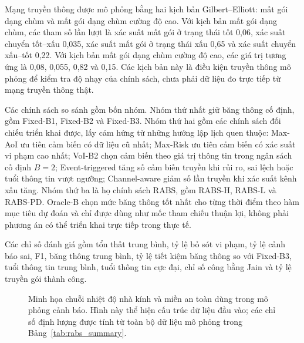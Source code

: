 \documentclass[10pt]{article}
\begin{document}
Mạng truyền thông được mô phỏng bằng hai kịch bản Gilbert--Elliott: mất gói dạng chùm và mất gói dạng chùm cường độ cao. Với kịch bản mất gói dạng chùm, các tham số lần lượt là xác suất mất gói ở trạng thái tốt 0,06, xác suất chuyển tốt--xấu 0,035, xác suất mất gói ở trạng thái xấu 0,65 và xác suất chuyển xấu--tốt 0,22. Với kịch bản mất gói dạng chùm cường độ cao, các giá trị tương ứng là 0,08, 0,055, 0,82 và 0,15. Các kịch bản này là điều kiện truyền thông mô phỏng để kiểm tra độ nhạy của chính sách, chưa phải dữ liệu đo trực tiếp từ mạng truyền thông thật.

Các chính sách so sánh gồm bốn nhóm. Nhóm thứ nhất giữ băng thông cố định, gồm Fixed-B1, Fixed-B2 và Fixed-B3. Nhóm thứ hai gồm các chính sách đối chiếu triển khai được, lấy cảm hứng từ những hướng lập lịch quen thuộc: Max-AoI ưu tiên cảm biến có dữ liệu cũ nhất; Max-Risk ưu tiên cảm biến có xác suất vi phạm cao nhất; VoI-B2 chọn cảm biến theo giá trị thông tin trong ngân sách cố định $B=2$; Event-triggered tăng số cảm biến truyền khi rủi ro, sai lệch hoặc tuổi thông tin vượt ngưỡng; Channel-aware giảm số lần truyền khi xác suất kênh xấu tăng. Nhóm thứ ba là họ chính sách RABS, gồm RABS-H, RABS-L và RABS-PD. Oracle-B chọn mức băng thông tốt nhất cho từng thời điểm theo hàm mục tiêu dự đoán và chỉ được dùng như mốc tham chiếu thuận lợi, không phải phương án có thể triển khai trực tiếp trong thực tế.

Các chỉ số đánh giá gồm tổn thất trung bình, tỷ lệ bỏ sót vi phạm, tỷ lệ cảnh báo sai, F1, băng thông trung bình, tỷ lệ tiết kiệm băng thông so với Fixed-B3, tuổi thông tin trung bình, tuổi thông tin cực đại, chỉ số công bằng Jain \cite{jain1984fairness} và tỷ lệ truyền gói thành công.

\begin{figure}[ht]
\centering
{}
\caption{Minh họa chuỗi nhiệt độ nhà kính và miền an toàn dùng trong mô phỏng cảnh báo. Hình này thể hiện cấu trúc dữ liệu đầu vào; các chỉ số định lượng được tính từ toàn bộ dữ liệu mô phỏng trong Bảng~\ref{tab:rabs_summary}.}
\label{fig:greenhouse_temperature_sample}
\end{figure}
\end{document}
